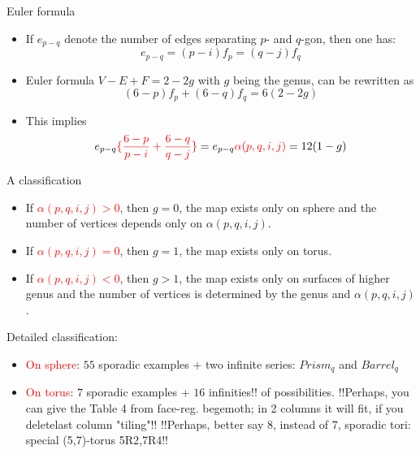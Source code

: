 \documentclass[%
pdf,
colorBG,
slideColor,
]{prosper}
\begin{document}
\begin{slide}{Euler formula}
\begin{itemize}
\item If $e_{p-q}$ denote the number of edges 
separating $p$- and $q$-gon, then one has:
\begin{equation*}
e_{p-q}=(p-i)f_p=(q-j)f_q
\end{equation*}
\item Euler formula $V-E+F=2-2g$ with $g$ being the genus,
can be rewritten as
\begin{equation*}
(6-p)f_p+(6-q)f_q=6(2-2g)
\end{equation*}
\item This implies
\begin{equation*}
e_{p-q}\textcolor{red}{\{\frac{6-p}{p-i}+\frac{6-q}{q-j}\} }=e_{p-q}\textcolor{red}{\alpha(p,q,i,j)}=12(1-g)
\end{equation*}
\end{itemize}


\end{slide}








\begin{slide}{A classification}
\vspace{-3mm}
\begin{itemize}
\item If \textcolor{red}{$\alpha(p,q,i,j)>0$}, then $g=0$, the map exists only on sphere and the number of vertices depends only on $\alpha(p,q,i,j)$.
\item If \textcolor{red}{$\alpha(p,q,i,j)=0$}, then $g=1$, the map exists only on torus.
\item If \textcolor{red}{$\alpha(p,q,i,j)<0$}, then $g>1$, the map exists only on surfaces of higher genus and the number of vertices is determined by the genus and $\alpha(p,q,i,j)$.
\end{itemize}
Detailed classification:
\begin{itemize}
\item \textcolor{red}{On sphere}: $55$ sporadic examples + two infinite series: $Prism_q$ and $Barrel_q$
\item \textcolor{red}{On torus}: $7$ sporadic examples + $16$ infinities!! 
of possibilities.
!!Perhaps, you can give the Table 4 from face-reg. begemoth; in 2 columns 
it will fit, if you deletelast column "tiling"!!
!!Perhaps, better say 8, instead of 7, sporadic tori: special (5,7)-torus 
5R2,7R4!!
\end{itemize}


\end{slide}
\end{document}
